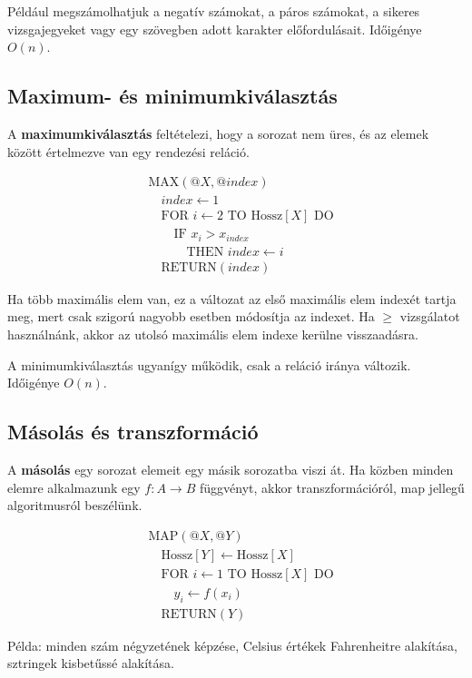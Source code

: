 Például megszámolhatjuk a negatív számokat, a páros számokat, a sikeres vizsgajegyeket vagy egy szövegben adott karakter előfordulásait. Időigénye $O(n)$.

\subsection{Maximum- és minimumkiválasztás}

A \textbf{maximumkiválasztás} feltételezi, hogy a sorozat nem üres, és az elemek között értelmezve van egy rendezési reláció.

\[
\begin{aligned}
&\text{MAX}(@X,@index)\\
&\quad index\leftarrow 1\\
&\quad \text{FOR } i\leftarrow 2 \text{ TO Hossz}[X] \text{ DO}\\
&\quad\quad \text{IF } x_i>x_{index}\\
&\quad\quad\quad \text{THEN } index\leftarrow i\\
&\quad \text{RETURN}(index)
\end{aligned}
\]

Ha több maximális elem van, ez a változat az első maximális elem indexét tartja meg, mert csak szigorú nagyobb esetben módosítja az indexet. Ha $\geq$ vizsgálatot használnánk, akkor az utolsó maximális elem indexe kerülne visszaadásra.

A minimumkiválasztás ugyanígy működik, csak a reláció iránya változik. Időigénye $O(n)$.

\subsection{Másolás és transzformáció}

A \textbf{másolás} egy sorozat elemeit egy másik sorozatba viszi át. Ha közben minden elemre alkalmazunk egy $f:A\to B$ függvényt, akkor transzformációról, map jellegű algoritmusról beszélünk.

\[
\begin{aligned}
&\text{MAP}(@X,@Y)\\
&\quad \text{Hossz}[Y]\leftarrow \text{Hossz}[X]\\
&\quad \text{FOR } i\leftarrow 1 \text{ TO Hossz}[X] \text{ DO}\\
&\quad\quad y_i\leftarrow f(x_i)\\
&\quad \text{RETURN}(Y)
\end{aligned}
\]

Példa: minden szám négyzetének képzése, Celsius értékek Fahrenheitre alakítása, sztringek kisbetűssé alakítása.

